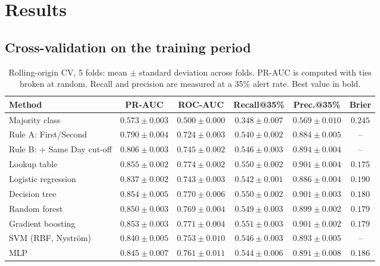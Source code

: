 \section{Results}
\label{sec:results}

\subsection{Cross-validation on the training period}
\begin{table}[!htbp]
  \centering
  \caption{Rolling-origin CV, 5 folds: mean $\pm$ standard deviation across folds. PR-AUC is computed with ties broken at random. Recall and precision are measured at a 35\% alert rate. Best value in bold.}
  \label{tab:cv}
  \footnotesize
  \setlength{\tabcolsep}{3pt}
  \begin{tabular}{l c c c c c}
    \toprule
    \textbf{Method} & \textbf{PR-AUC} & \textbf{ROC-AUC} & \textbf{Recall@35\%} & \textbf{Prec.@35\%} & \textbf{Brier} \\
    \midrule
    Majority class           & $0.573 \pm 0.003$ & $0.500 \pm 0.000$ & $0.348 \pm 0.007$ & $0.569 \pm 0.010$ & $0.245$ \\
    Rule A: First/Second     & $0.790 \pm 0.004$ & $0.724 \pm 0.003$ & $0.540 \pm 0.002$ & $0.884 \pm 0.005$ & -- \\
    Rule B: + Same Day cut-off & $0.806 \pm 0.003$ & $0.745 \pm 0.002$ & $0.546 \pm 0.003$ & $0.894 \pm 0.004$ & -- \\
    Lookup table             & $\mathbf{0.855 \pm 0.002}$ & $\mathbf{0.774 \pm 0.002}$ & $0.550 \pm 0.002$ & $0.901 \pm 0.004$ & $\mathbf{0.175}$ \\
    \midrule
    Logistic regression      & $0.837 \pm 0.002$ & $0.743 \pm 0.003$ & $0.542 \pm 0.001$ & $0.886 \pm 0.004$ & $0.190$ \\
    Decision tree            & $0.854 \pm 0.005$ & $0.770 \pm 0.006$ & $0.550 \pm 0.002$ & $0.901 \pm 0.003$ & $0.180$ \\
    Random forest            & $0.850 \pm 0.003$ & $0.769 \pm 0.004$ & $0.549 \pm 0.003$ & $0.899 \pm 0.002$ & $0.179$ \\
    Gradient boosting        & $0.853 \pm 0.003$ & $0.771 \pm 0.004$ & $\mathbf{0.551 \pm 0.003}$ & $\mathbf{0.901 \pm 0.002}$ & $0.179$ \\
    SVM (RBF, Nystr\"om)     & $0.840 \pm 0.005$ & $0.753 \pm 0.010$ & $0.546 \pm 0.003$ & $0.893 \pm 0.005$ & -- \\
    MLP                      & $0.845 \pm 0.007$ & $0.761 \pm 0.011$ & $0.544 \pm 0.006$ & $0.891 \pm 0.008$ & $0.186$ \\
    \bottomrule
  \end{tabular}
\end{table}

